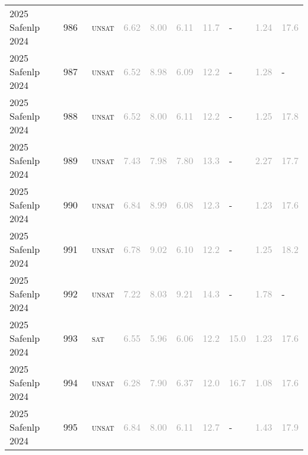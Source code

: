 \begin{center}
{\begin{longtable}{@{}llllllllll@{}}
2025 Safenlp 2024 & 986 & ~\textsc{unsat} & \textcolor{darkgray}{6.62} & \textcolor{darkgray}{8.00} & \textcolor{darkgray}{6.11} & \textcolor{darkgray}{11.7} & - & \textcolor{darkgray}{1.24} & \textcolor{darkgray}{17.6} \\
2025 Safenlp 2024 & 987 & ~\textsc{unsat} & \textcolor{darkgray}{6.52} & \textcolor{darkgray}{8.98} & \textcolor{darkgray}{6.09} & \textcolor{darkgray}{12.2} & - & \textcolor{darkgray}{1.28} & - \\
2025 Safenlp 2024 & 988 & ~\textsc{unsat} & \textcolor{darkgray}{6.52} & \textcolor{darkgray}{8.00} & \textcolor{darkgray}{6.11} & \textcolor{darkgray}{12.2} & - & \textcolor{darkgray}{1.25} & \textcolor{darkgray}{17.8} \\
2025 Safenlp 2024 & 989 & ~\textsc{unsat} & \textcolor{darkgray}{7.43} & \textcolor{darkgray}{7.98} & \textcolor{darkgray}{7.80} & \textcolor{darkgray}{13.3} & - & \textcolor{darkgray}{2.27} & \textcolor{darkgray}{17.7} \\
2025 Safenlp 2024 & 990 & ~\textsc{unsat} & \textcolor{darkgray}{6.84} & \textcolor{darkgray}{8.99} & \textcolor{darkgray}{6.08} & \textcolor{darkgray}{12.3} & - & \textcolor{darkgray}{1.23} & \textcolor{darkgray}{17.6} \\
2025 Safenlp 2024 & 991 & ~\textsc{unsat} & \textcolor{darkgray}{6.78} & \textcolor{darkgray}{9.02} & \textcolor{darkgray}{6.10} & \textcolor{darkgray}{12.2} & - & \textcolor{darkgray}{1.25} & \textcolor{darkgray}{18.2} \\
2025 Safenlp 2024 & 992 & ~\textsc{unsat} & \textcolor{darkgray}{7.22} & \textcolor{darkgray}{8.03} & \textcolor{darkgray}{9.21} & \textcolor{darkgray}{14.3} & - & \textcolor{darkgray}{1.78} & - \\
2025 Safenlp 2024 & 993 & ~\textsc{sat} & \textcolor{darkgray}{6.55} & \textcolor{darkgray}{5.96} & \textcolor{darkgray}{6.06} & \textcolor{darkgray}{12.2} & \textcolor{darkgray}{15.0} & \textcolor{darkgray}{1.23} & \textcolor{darkgray}{17.6} \\
2025 Safenlp 2024 & 994 & ~\textsc{unsat} & \textcolor{darkgray}{6.28} & \textcolor{darkgray}{7.90} & \textcolor{darkgray}{6.37} & \textcolor{darkgray}{12.0} & \textcolor{darkgray}{16.7} & \textcolor{darkgray}{1.08} & \textcolor{darkgray}{17.6} \\
2025 Safenlp 2024 & 995 & ~\textsc{unsat} & \textcolor{darkgray}{6.84} & \textcolor{darkgray}{8.00} & \textcolor{darkgray}{6.11} & \textcolor{darkgray}{12.7} & - & \textcolor{darkgray}{1.43} & \textcolor{darkgray}{17.9} \\

\end{longtable}}
\end{center}
